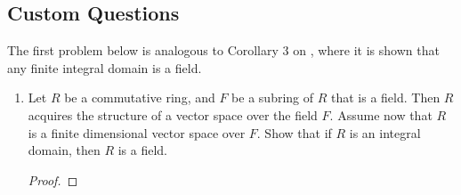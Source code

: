 \documentclass[../psets.tex]{subfiles}
\begin{document}
\subsection*{Custom Questions}
The first problem below is analogous to Corollary 3 on \textcite[228]{bib:DummitFoote}, where it is shown that any finite integral domain is a field.
\begin{enumerate}[resume]
    \item Let $R$ be a commutative ring, and $F$ be a subring of $R$ that is a field. Then $R$ acquires the structure of a vector space over the field $F$. Assume now that $R$ is a finite dimensional vector space over $F$. Show that if $R$ is an integral domain, then $R$ is a field.
    \begin{proof}




\end{proof}
\end{enumerate}
\end{document}
